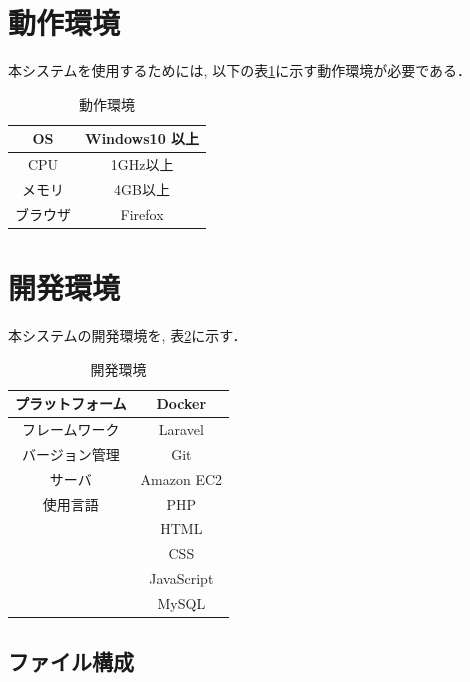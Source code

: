 \documentclass[a4paper, titlepage]{jsarticle}
\begin{document}
\section{動作環境}
本システムを使用するためには, 以下の表\ref{tab:OpEnv}に示す動作環境が必要である．

\begin{table}[H]
  \centering
  \begin{tabular}{c|c} \hline
    OS & Windows10 以上 \\ \hline
    CPU & 1GHz以上 \\ \hline
    メモリ & 4GB以上 \\ \hline
    ブラウザ & Firefox \\ \hline
  \end{tabular}
  \caption{動作環境}
  \label{tab:OpEnv}
\end{table}

\section{開発環境}
本システムの開発環境を, 表\ref{tab:DevEnv}に示す．
\begin{table}[H]
  \centering
  \begin{tabular}{c|c} \hline
    プラットフォーム & Docker \\ \hline
    フレームワーク & Laravel \\ \hline
    バージョン管理 & Git \\ \hline
    サーバ & Amazon EC2 \\ \hline
    使用言語 & PHP \\
    & HTML \\
    & CSS \\
    & JavaScript \\
    & MySQL \\ \hline
  \end{tabular}
  \caption{開発環境}
  \label{tab:DevEnv}
\end{table}

\subsection{ファイル構成}
\end{document}
